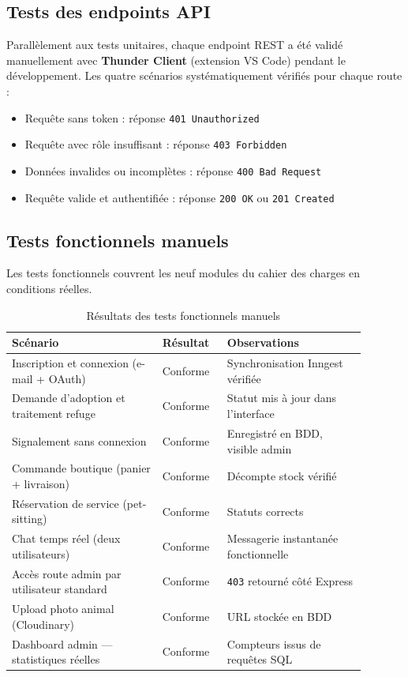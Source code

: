 \documentclass[12pt,a4paper]{report}
\begin{document}
\subsection{Tests des endpoints API}

Parallèlement aux tests unitaires, chaque endpoint REST a été validé manuellement avec \textbf{Thunder Client} (extension VS Code) pendant le développement. Les quatre scénarios systématiquement vérifiés pour chaque route :
\begin{itemize}[leftmargin=2em,itemsep=2pt]
  \item Requête sans token : réponse \texttt{401 Unauthorized}
  \item Requête avec rôle insuffisant : réponse \texttt{403 Forbidden}
  \item Données invalides ou incomplètes : réponse \texttt{400 Bad Request}
  \item Requête valide et authentifiée : réponse \texttt{200 OK} ou \texttt{201 Created}
\end{itemize}

\subsection{Tests fonctionnels manuels}

Les tests fonctionnels couvrent les neuf modules du cahier des charges en conditions réelles.

\begin{table}[H]
\centering
\begin{tabular}{@{}L{0.38\linewidth}L{0.16\linewidth}L{0.35\linewidth}@{}}
\toprule
\textbf{Scénario} & \textbf{Résultat} & \textbf{Observations} \\
\midrule
Inscription et connexion (e-mail + OAuth) & Conforme & Synchronisation Inngest vérifiée \\
Demande d'adoption et traitement refuge & Conforme & Statut mis à jour dans l'interface \\
Signalement sans connexion & Conforme & Enregistré en BDD, visible admin \\
Commande boutique (panier + livraison) & Conforme & Décompte stock vérifié \\
Réservation de service (pet-sitting) & Conforme & Statuts corrects \\
Chat temps réel (deux utilisateurs) & Conforme & Messagerie instantanée fonctionnelle \\
Accès route admin par utilisateur standard & Conforme & \texttt{403} retourné côté Express \\
Upload photo animal (Cloudinary) & Conforme & URL stockée en BDD \\
Dashboard admin --- statistiques réelles & Conforme & Compteurs issus de requêtes SQL \\
\bottomrule
\end{tabular}
\caption{Résultats des tests fonctionnels manuels}
\label{tab:tests}
\end{table}
\end{document}
